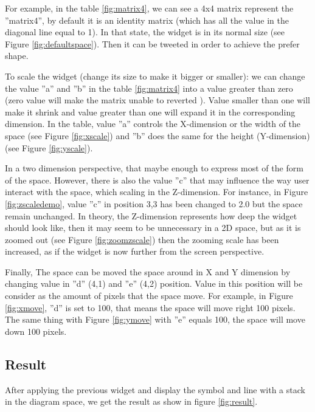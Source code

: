 For example, in the table \ref{fig:matrix4}, we can see a 4x4 matrix represent the ''matrix4'', by default it is an identity matrix (which has all the value in the diagonal line equal to 1). In that state, the widget is in its normal size (see Figure \ref{fig:defaultspace}). Then it can  be tweeted in order to achieve the prefer shape.

To scale the widget (change its size to make it bigger or smaller): we can change the value ''a'' and ''b'' in the table \ref{fig:matrix4} into a value greater than zero (zero value will make the matrix unable to reverted ). Value smaller than one will make it shrink and value greater than one will expand it in the corresponding dimension. In the table, value ''a'' controls the X-dimension or the width of the space (see Figure \ref{fig:xscale}) and ''b'' does the same for the height (Y-dimension) (see Figure \ref{fig:yscale}).

In a two dimension perspective, that maybe enough to express most of the form of the space. However, there is also the value ''c'' that may influence the way user interact with the space, which scaling in the Z-dimension. For instance, in Figure \ref{fig:zscaledemo}, value ''c'' in position 3,3 has been changed to 2.0 but the space remain unchanged. In theory, the Z-dimension represents how deep the widget should look like, then it may seem to be unnecessary in a 2D space, but as it is zoomed out (see Figure \ref{fig:zoomzscale}) then the zooming scale has been increased, as if the widget is now further from the screen perspective.

Finally, The space can be moved the space around in X and Y dimension by changing value in ''d'' (4,1) and ''e'' (4,2) position. Value in this position will be consider as the amount of pixels that the space move. For example, in Figure \ref{fig:xmove}, ''d'' is set to 100, that means the space will move right 100 pixels. The same thing with Figure  \ref{fig:ymove} with ''e'' equals 100, the space will move down 100 pixels.

\subsection{Result}
After applying the previous widget and display the symbol and line with a stack in the diagram space, we get the result as show in figure \ref{fig:result}.


